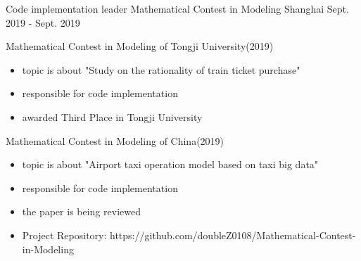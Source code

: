 \begin{cventries}
  \cventry
    {Code implementation leader} %
    {Mathematical Contest in Modeling} %
    {Shanghai} %
    {Sept. 2019 - Sept. 2019} %
    {
      \begin{cvitems} %
        \item {Mathematical Contest in Modeling of Tongji University(2019)}
        \begin{itemize}
            \item {topic is about "Study on the rationality of train ticket purchase"}
            \item {responsible for code implementation}
            \item {awarded Third Place in Tongji University}
        \end{itemize}
        \item {Mathematical Contest in Modeling of China(2019)}
        \begin{itemize}
            \item {topic is about "Airport taxi operation model based on taxi big data"}
            \item {responsible for code implementation}
            \item {the paper is being reviewed}
            \item {Project Repository: https://github.com/doubleZ0108/Mathematical-Contest-in-Modeling}
        \end{itemize}
      \end{cvitems}
    }    
    ~\\
\end{cventries}
